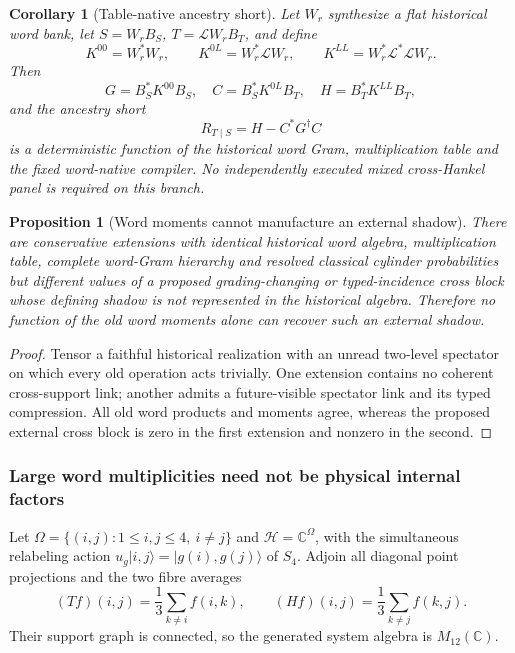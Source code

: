\documentclass[11pt]{article}
\numberwithin{equation}{section}
\newtheorem{proposition}[theorem]{Proposition}
\newtheorem{corollary}[theorem]{Corollary}
\theoremstyle{definition}
\theoremstyle{remark}
\newcommand{\C}{\mathbb C}
\newcommand{\Hh}{\mathcal H}
\begin{document}
\begin{corollary}[Table-native ancestry short]
\label{cor:table-native-ancestry}
Let $W_r$ synthesize a flat historical word bank, let
$S=W_rB_S$, $T=\mathscr L W_rB_T$, and define
\[
 K^{00}=W_r^*W_r,\qquad
 K^{0L}=W_r^*\mathscr LW_r,\qquad
 K^{LL}=W_r^*\mathscr L^*\mathscr LW_r.
\]
Then
\begin{equation}
 G=B_S^*K^{00}B_S,
 \quad C=B_S^*K^{0L}B_T,
 \quad H=B_T^*K^{LL}B_T,
 \label{eq:table-native-GCH}
\end{equation}
and the ancestry short
\begin{equation}
 R_{T\mid S}=H-C^*G^\dagger C
 \label{eq:table-native-short}
\end{equation}
is a deterministic function of the historical word Gram, multiplication table
and the fixed word-native compiler.  No independently executed mixed
cross-Hankel panel is required on this branch.
\end{corollary}

\begin{proposition}[Word moments cannot manufacture an external shadow]
\label{thm:external-shadow-no-go}
There are conservative extensions with identical historical word algebra,
multiplication table, complete word-Gram hierarchy and resolved classical
cylinder probabilities but different values of a proposed grading-changing or
typed-incidence cross block whose defining shadow is not represented in the
historical algebra.  Therefore no function of the old word moments alone can
recover such an external shadow.
\end{proposition}

\begin{proof}
Tensor a faithful historical realization with an unread two-level spectator on
which every old operation acts trivially.  One extension contains no coherent
cross-support link; another admits a future-visible spectator link and its
typed compression.  All old word products and moments agree, whereas the
proposed external cross block is zero in the first extension and nonzero in the
second.
\end{proof}


\subsubsection{Large word multiplicities need not be physical internal factors}
\label{app:historical-source-selection}

Let $\Omega=\{(i,j):1\le i,j\le4,\ i\ne j\}$ and
$\Hh=\C^\Omega$, with the simultaneous relabeling action
$u_g|i,j\rangle=|g(i),g(j)\rangle$ of $S_4$.  Adjoin all diagonal point
projections and the two fibre averages
\[
 (Tf)(i,j)=\frac13\sum_{k\ne i}f(i,k),\qquad
 (Hf)(i,j)=\frac13\sum_{k\ne j}f(k,j).
\]
Their support graph is connected, so the generated system algebra is
$M_{12}(\C)$.
\end{document}
